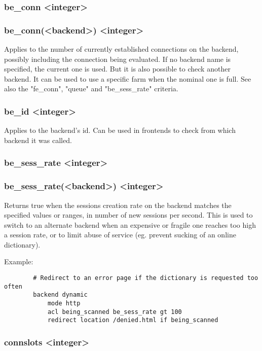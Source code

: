 \subsubsection[be\_conn]{be\_conn <integer>}
\subsubsection*{be\_conn(<backend>) <integer>}
  Applies to the number of currently established connections on the backend,
  possibly including the connection being evaluated. If no backend name is
  specified, the current one is used. But it is also possible to check another
  backend. It can be used to use a specific farm when the nominal one is full.
  See also the "fe\_conn", "queue" and "be\_sess\_rate" criteria.

\subsubsection[be\_id]{be\_id <integer>}
  Applies to the backend's id. Can be used in frontends to check from which
  backend it was called.

\subsubsection[be\_sess\_rate]{be\_sess\_rate <integer>}
\subsubsection*{be\_sess\_rate(<backend>) <integer>}
  Returns true when the sessions creation rate on the backend matches the
  specified values or ranges, in number of new sessions per second. This is
  used to switch to an alternate backend when an expensive or fragile one
  reaches too high a session rate, or to limit abuse of service (eg. prevent
  sucking of an online dictionary).

  Example:
  \begin{verbatim}
        # Redirect to an error page if the dictionary is requested too often
        backend dynamic
            mode http
            acl being_scanned be_sess_rate gt 100
            redirect location /denied.html if being_scanned
  \end{verbatim}

\subsubsection[connslots]{connslots <integer>}
